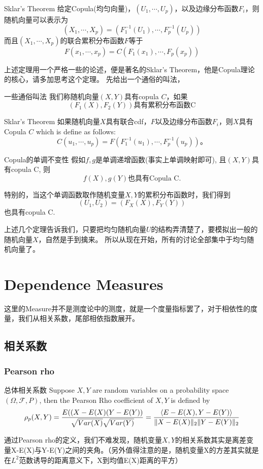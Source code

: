 \documentclass[12pt]{article}
\begin{document}
\begin{stheorem}{Sklar's Theorem}{}
给定Copula(均匀向量)，$(U_1,\cdots,U_p)$，以及边缘分布函数$F_i$，则随机向量可以表示为
$$
(X_1,\cdots,X_p) = (F_1^{-1}(U_1),\cdots,F_p^{-1}(U_p))
$$
而且$(X_1,\cdots,X_p)$的联合累积分布函数$F$等于
$$
F(x_1,\cdots,x_p) = C(F_1(x_1),\cdots,F_p(x_p))
$$
\end{stheorem}
上述定理用一个严格一些的论述，便是著名的Sklar's Theorem，他是Copula理论的核心，请多加思考这个定理。
先给出一个通俗的叫法，
\begin{sdefinition}{一些通俗叫法}{}
我们称随机向量$(X,Y)$具有copula $C$，如果
$$
(F_1(X),F_2(Y)) \text{具有累积分布函数C}
$$
\end{sdefinition}
\begin{stheorem}{Sklar's Theorem}{}
如果随机向量$X$具有联合cdf，$F$以及边缘分布函数$F_i$，则$X$具有Copula $C$ which is define as follows:
$$
C(u_1,\cdots,u_p) = F(F_1^{-1}(u_1),\cdots,F_p^{-1}(u_p))。
$$
\end{stheorem}







\begin{stheorem}{Copula的单调不变性}{}
假如$f,g$是单调递增函数(事实上单调映射即可), 且$(X,Y)$具有copula C, 则
$$
f(X), g(Y) \text{也具有Copula C}.
$$
\end{stheorem}
\begin{sremark}{}{}
特别的，当这个单调函数取作随机变量$X,Y$的累积分布函数时，我们得到
$$
(U_1,U_2) = (F_X(X),F_Y(Y))
$$
也具有copula C.
\end{sremark}
上述几个定理告诉我们，只要把均匀随机向量$U$的结构弄清楚了，要模拟出一般的随机向量$X$，自然是手到擒来。
所以从现在开始，所有的讨论全部集中于均匀随机向量了。



\section{Dependence Measures}
这里的Measure并不是测度论中的测度，就是一个度量指标罢了，对于相依性的度量，我们从相关系数，尾部相依指数展开。
\subsection{相关系数}
\subsubsection{Pearson rho}
\begin{sdefinition}{总体相关系数}{}
Suppose $X,Y$ are random variables on a probability space $(\Omega,\mathcal{F},P)$, then the Pearson Rho coefficient of $X,Y$ is defined by 
$$
\rho_p(X,Y) = \frac{E((X-E(X)(Y-E(Y))}{\sqrt{Var(X)}\sqrt{Var(Y)}} = \frac{{\langle E-E(X),Y-E(Y)\rangle}}{\Vert X-E(X)\Vert_2 \Vert Y-E(Y) \Vert_2}
$$
\end{sdefinition}
\begin{sremark}{}{}
通过Pearson rho的定义，我们不难发现，随机变量$X,Y$的相关系数其实是离差变量X-E(X)与Y-E(Y)之间的夹角。（另外值得注意的是，随机变量X的方差其实就是在$L^2$范数诱导的距离意义下，X到均值E(X)距离的平方）
\end{sremark}
\end{document}
